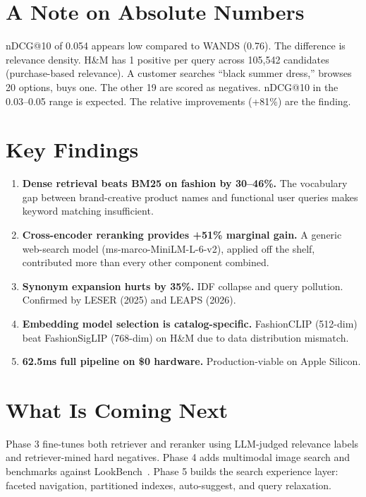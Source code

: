 \documentclass[11pt,a4paper]{article}
\begin{document}
\section{A Note on Absolute Numbers}

nDCG@10 of 0.054 appears low compared to WANDS (0.76). The difference is relevance density. H\&M has 1 positive per query across 105,542 candidates (purchase-based relevance). A customer searches ``black summer dress,'' browses 20 options, buys one. The other 19 are scored as negatives. nDCG@10 in the 0.03--0.05 range is expected. The relative improvements (+81\%) are the finding.

\section{Key Findings}

\begin{enumerate}[nosep]
    \item \textbf{Dense retrieval beats BM25 on fashion by 30--46\%.} The vocabulary gap between brand-creative product names and functional user queries makes keyword matching insufficient.
    \item \textbf{Cross-encoder reranking provides +51\% marginal gain.} A generic web-search model (ms-marco-MiniLM-L-6-v2), applied off the shelf, contributed more than every other component combined.
    \item \textbf{Synonym expansion hurts by 35\%.} IDF collapse and query pollution. Confirmed by LESER (2025) and LEAPS (2026).
    \item \textbf{Embedding model selection is catalog-specific.} FashionCLIP (512-dim) beat FashionSigLIP (768-dim) on H\&M due to data distribution mismatch.
    \item \textbf{62.5ms full pipeline on \$0 hardware.} Production-viable on Apple Silicon.
\end{enumerate}

\section{What Is Coming Next}

Phase 3 fine-tunes both retriever and reranker using LLM-judged relevance labels and retriever-mined hard negatives. Phase 4 adds multimodal image search and benchmarks against LookBench~\cite{lookbench}. Phase 5 builds the search experience layer: faceted navigation, partitioned indexes, auto-suggest, and query relaxation.
\end{document}

